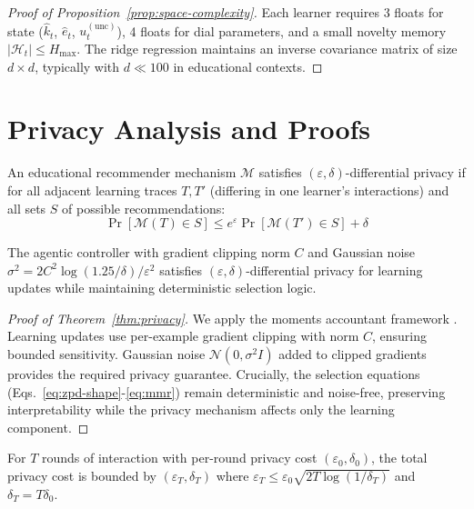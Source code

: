 \begin{proof}[Proof of Proposition~\ref{prop:space-complexity}]
Each learner requires 3 floats for state ($\widehat{k}_t$, $\widehat{e}_t$, $u_t^{(\mathrm{unc})}$), 4 floats for dial parameters, and a small novelty memory $|\mathcal{H}_t| \leq H_{\max}$. The ridge regression maintains an inverse covariance matrix of size $d \times d$, typically with $d \ll 100$ in educational contexts.
\end{proof}

\section{Privacy Analysis and Proofs}
\label{app:privacy}

\begin{definition}
\label{def:edp}
An educational recommender mechanism $\mathcal{M}$ satisfies $(\varepsilon,\delta)$-differential privacy if for all adjacent learning traces $T, T'$ (differing in one learner's interactions) and all sets $S$ of possible recommendations:
$$\Pr[\mathcal{M}(T) \in S] \leq e^{\varepsilon} \Pr[\mathcal{M}(T') \in S] + \delta$$
\end{definition}

\begin{theorem}
\label{thm:privacy}
The agentic controller with gradient clipping norm $C$ and Gaussian noise $\sigma^2 = 2C^2 \log(1.25/\delta) / \varepsilon^2$ satisfies $(\varepsilon,\delta)$-differential privacy for learning updates while maintaining deterministic selection logic.
\end{theorem}

\begin{proof}[Proof of Theorem~\ref{thm:privacy}]
We apply the moments accountant framework \cite{Abadi2016}. Learning updates use per-example gradient clipping with norm $C$, ensuring bounded sensitivity. Gaussian noise $\mathcal{N}(0,\sigma^2 I)$ added to clipped gradients provides the required privacy guarantee. Crucially, the selection equations (Eqs.~\eqref{eq:zpd-shape}-\eqref{eq:mmr}) remain deterministic and noise-free, preserving interpretability while the privacy mechanism affects only the learning component.
\end{proof}

\begin{proposition}
\label{prop:privacy-composition}
For $T$ rounds of interaction with per-round privacy cost $(\varepsilon_0, \delta_0)$, the total privacy cost is bounded by $(\varepsilon_T, \delta_T)$ where $\varepsilon_T \leq \varepsilon_0 \sqrt{2T \log(1/\delta_T)}$ and $\delta_T = T \delta_0$.
\end{proposition}

